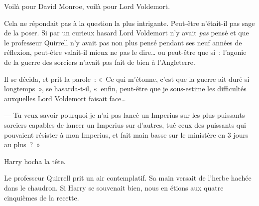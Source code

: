 Voilà pour David Monroe, voilà pour Lord Voldemort.

Cela ne répondait pas à la question la plus intrigante. Peut-être n'était-il pas sage de la poser. Si par un curieux hasard Lord Voldemort n'y avait \emph{pas} pensé et que le professeur Quirrell n'y avait pas non plus pensé pendant ses neuf années de réflexion, peut-être valait-il mieux ne pas le dire… ou peut-être que si~: l'agonie de la guerre des sorciers n'avait pas fait de bien à l'Angleterre.

Il se décida, et prit la parole~: «~Ce qui m'étonne, c'est que la guerre ait duré si longtemps~», se hasarda-t-il, «~enfin, peut-être que je sous-estime les difficultés auxquelles Lord Voldemort faisait face…

--- Tu veux savoir pourquoi je n'ai pas lancé un Imperius sur les plus puissants sorciers capables de lancer un Imperius sur d'autres, tué ceux des puissants qui pouvaient résister à mon Imperius, et fait main basse sur le ministère en 3 jours au plus~?~»

Harry hocha la tête.

Le professeur Quirrell prit un air contemplatif. Sa main versait de l'herbe hachée dans le chaudron. Si Harry se souvenait bien, nous en étions aux quatre cinquièmes de la recette.

